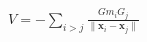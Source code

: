 \documentclass[preview]{standalone}
\begin{document}
\begin{align*}
V=-\sum_{i>j} \frac{Gm_iG_j}{\|\mathbf x_i - \mathbf x_j\|}
\end{align*}
\end{document}
